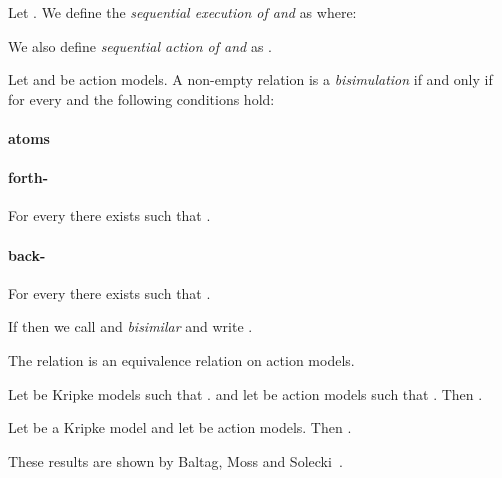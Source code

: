 \documentclass[twoside]{aiml14}
\begin{document}
  \begin{definition}
      Let .
      We define the {\em sequential execution of  and } as
       where:
      

      We also define {\em sequential action of  and } as
      .
  \end{definition}

  \begin{definition}
      Let  
      and 
      be action models. 
      A non-empty relation 
      is a {\em bisimulation} if and only if for every  
      and  the following conditions hold:

      \paragraph{atoms}
      

      \paragraph{forth-}
      For every  
      there exists 
      such that .

      \paragraph{back-}
      For every 
      there exists  
      such that .

      If  then we call
       and 
      {\em bisimilar} and write 
      .
  \end{definition}

  \begin{proposition}
      The relation  is an equivalence relation on action models.
  \end{proposition}

  \begin{proposition}
      Let  be Kripke models such that
      . 
      and let  be action models such that
      .
      Then
      .
  \end{proposition}

  \begin{proposition}
      Let  be a Kripke model
      and let  be action models.
      Then 
      .
  \end{proposition}

  These results are shown by Baltag, Moss and Solecki~\cite{baltag1998,baltag2005}.
\end{document}
